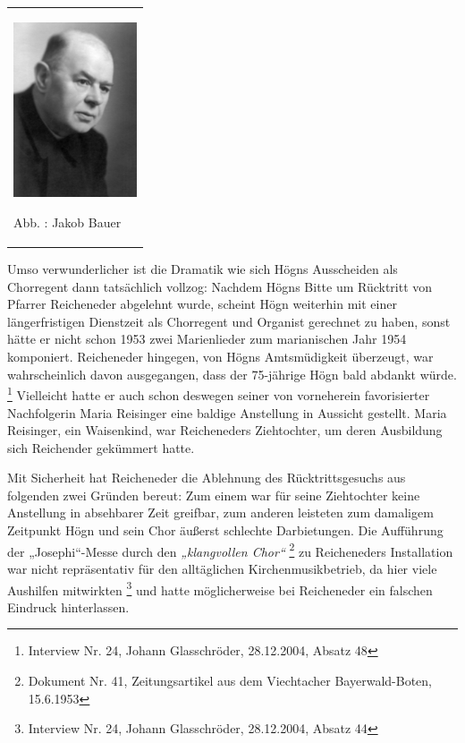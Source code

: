 \documentclass[a4paper]{article}
\newcommand\textstyleZitate[1]{\textit{#1}}
\newcommand\textstyleFootnoteSymbol[1]{\textsuperscript{#1}}
\newcounter{Abb}
\renewcommand\theAbb{\arabic{Abb}}
\begin{document}
\begin{center}
\begin{minipage}{4.032cm}
\begin{flushleft}
\tablefirsthead{}
\tablehead{}
\tabletail{}
\tablelasttail{}
\begin{supertabular}{m{3.832cm}}

\includegraphics[width=3.651cm,height=5.177cm]{pictures/zulassungsarbeit-img046.jpg}

Abb. \stepcounter{Abb}{\theAbb}: Jakob Bauer\\
\end{supertabular}
\end{flushleft}
\end{minipage}
\end{center}
Umso verwunderlicher ist die Dramatik wie sich Högns Ausscheiden als
Chorregent dann tatsächlich vollzog: Nachdem Högns Bitte um Rücktritt
von Pfarrer Reicheneder abgelehnt wurde, scheint Högn weiterhin mit
einer längerfristigen Dienstzeit als Chorregent und Organist gerechnet
zu haben, sonst hätte er nicht schon 1953 zwei Marienlieder zum
marianischen Jahr 1954 komponiert. Reicheneder hingegen, von Högns
Amtsmüdigkeit überzeugt, war wahrscheinlich davon ausgegangen, dass der
75-jährige Högn bald abdankt würde. \footnote{Interview Nr. 24, Johann
Glasschröder, 28.12.2004, Absatz 48} Vielleicht hatte er auch schon
deswegen seiner von vorneherein favorisierter Nachfolgerin Maria
Reisinger eine baldige Anstellung in Aussicht gestellt. Maria
Reisinger, ein Waisenkind, war Reicheneders Ziehtochter, um deren
Ausbildung sich Reichender gekümmert hatte.

Mit Sicherheit hat Reicheneder die Ablehnung des Rücktrittsgesuchs aus
folgenden zwei Gründen bereut: Zum einem war für seine Ziehtochter
keine Anstellung in absehbarer Zeit greifbar, zum anderen leisteten zum
damaligem Zeitpunkt Högn und sein Chor äußerst schlechte Darbietungen.
Die Aufführung der „Josephi“-Messe durch den
\textstyleZitate{„klangvollen Chor“}\textstyleFootnoteSymbol{
} \footnote{Dokument Nr. 41, Zeitungsartikel aus dem Viechtacher
Bayerwald-Boten, 15.6.1953} zu Reicheneders Installation war nicht
repräsentativ für den alltäglichen Kirchenmusikbetrieb, da hier viele
Aushilfen mitwirkten \footnote{Interview Nr. 24, Johann Glasschröder,
28.12.2004, Absatz 44} und hatte möglicherweise bei Reicheneder ein
falschen Eindruck hinterlassen.
\end{document}
